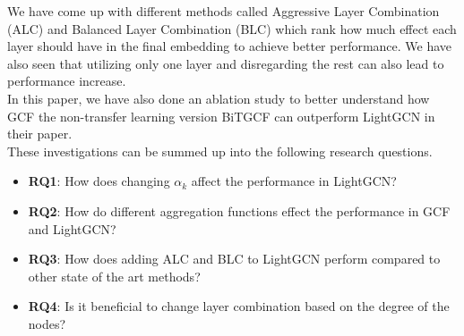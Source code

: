 We have come up with different methods called Aggressive Layer Combination (ALC) and Balanced Layer Combination (BLC) which rank how much effect each layer should have in the final embedding to achieve better performance.
We have also seen that utilizing only one layer and disregarding the rest can also lead to performance increase.
\\
In this paper, we have also done an ablation study to better understand how GCF the non-transfer learning version BiTGCF can outperform LightGCN in their paper.
\\
These investigations can be summed up into the following research questions.
\begin{itemize}
    \item \textbf{RQ1}: How does changing $\alpha_k$ affect the performance in LightGCN?
    \item \textbf{RQ2}: How do different aggregation functions effect the performance in GCF and LightGCN?
    \item \textbf{RQ3}: How does adding ALC and BLC to LightGCN perform compared to other state of the art methods?
    \item \textbf{RQ4}: Is it beneficial to change layer combination based on the degree of the nodes?
\end{itemize}
